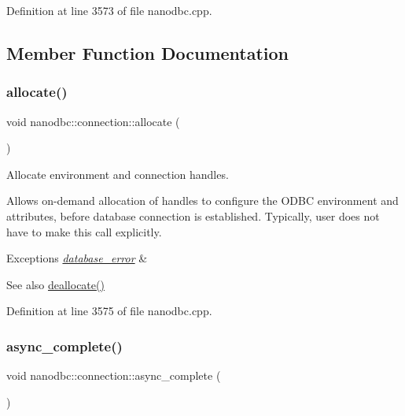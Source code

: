 Definition at line 3573 of file nanodbc.\+cpp.



\subsection{Member Function Documentation}
\mbox{\label{classnanodbc_1_1connection_abbb4205d3062eb487b71aeaa59d7d398}} 
\subsubsection{\texorpdfstring{allocate()}{allocate()}}
{\footnotesize\ttfamily void nanodbc\+::connection\+::allocate (\begin{DoxyParamCaption}{ }\end{DoxyParamCaption})}



Allocate environment and connection handles. 

Allows on-\/demand allocation of handles to configure the O\+D\+BC environment and attributes, before database connection is established. Typically, user does not have to make this call explicitly.


\begin{DoxyExceptions}{Exceptions}
{\em \mbox{\hyperlink{classnanodbc_1_1database__error}{database\+\_\+error}}} & \\
\hline
\end{DoxyExceptions}
\begin{DoxySeeAlso}{See also}
\mbox{\hyperlink{classnanodbc_1_1connection_a625a5575d144f49f75b0e637bf297fad}{deallocate()}} 
\end{DoxySeeAlso}


Definition at line 3575 of file nanodbc.\+cpp.

\mbox{\label{classnanodbc_1_1connection_a553744244891734178611487703063d3}} 
\subsubsection{\texorpdfstring{async\_complete()}{async\_complete()}}
{\footnotesize\ttfamily void nanodbc\+::connection\+::async\+\_\+complete (\begin{DoxyParamCaption}{ }\end{DoxyParamCaption})}



